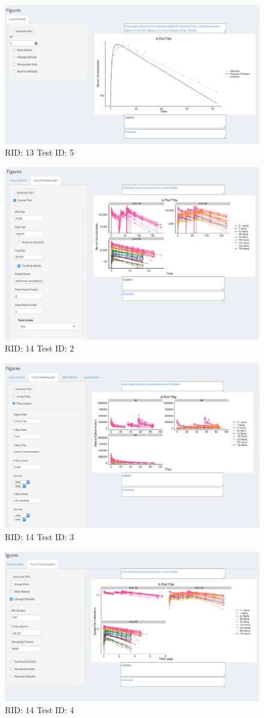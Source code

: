 \begin{figure}[H]
\includegraphics[width=.8\textwidth]{screencaps/13-5-1.png}
\caption{RID: 13 Test ID: 5}
\end{figure}
\begin{figure}[H]
\includegraphics[width=.8\textwidth]{screencaps/14-2-1.png}
\caption{RID: 14 Test ID: 2}
\end{figure}
\begin{figure}[H]
\includegraphics[width=.8\textwidth]{screencaps/14-3-1.png}
\caption{RID: 14 Test ID: 3}
\end{figure}
\begin{figure}[H]
\includegraphics[width=.8\textwidth]{screencaps/14-4-1.png}
\caption{RID: 14 Test ID: 4}
\end{figure}
